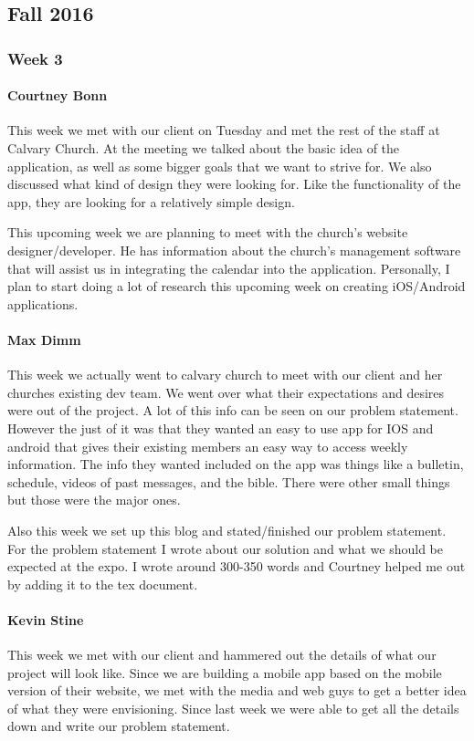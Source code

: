 
\subsection{Fall 2016}
	
		\subsubsection{Week 3}
		
			\paragraph{Courtney Bonn}
			This week we met with our client on Tuesday and met the rest of the staff at Calvary Church. At the meeting we talked about the basic idea of the application, as well as some bigger goals that we want to strive for. We also discussed what kind of design they were looking for. Like the functionality of the app, they are looking for a relatively simple design.

This upcoming week we are planning to meet with the church's website designer/developer. He has information about the church's management software that will assist us in integrating the calendar into the application. Personally, I plan to start doing a lot of research this upcoming week on creating iOS/Android applications.

			\paragraph{Max Dimm}
			This week we actually went to calvary church to meet with our client and her churches existing dev team. We went over what their expectations and desires were out of the project. A lot of this info can be seen on our problem statement. However the just of it was that they wanted an easy to use app for IOS and android that gives their existing members an easy way to access weekly information. The info they wanted included on the app was things like a bulletin, schedule, videos of past messages, and the bible. There were other small things but those were the major ones.

Also this week we set up this blog and stated/finished our problem statement. For the problem statement I wrote about our solution and what we should be expected at the expo. I wrote around 300-350 words and Courtney helped me out by adding it to the tex document.
			
			\paragraph{Kevin Stine}
			This week we met with our client and hammered out the details of what our project will look like. Since we are building a mobile app based on the mobile version of their website, we met with the media and web guys to get a better idea of what they were envisioning. Since last week we were able to get all the details down and write our problem statement.

